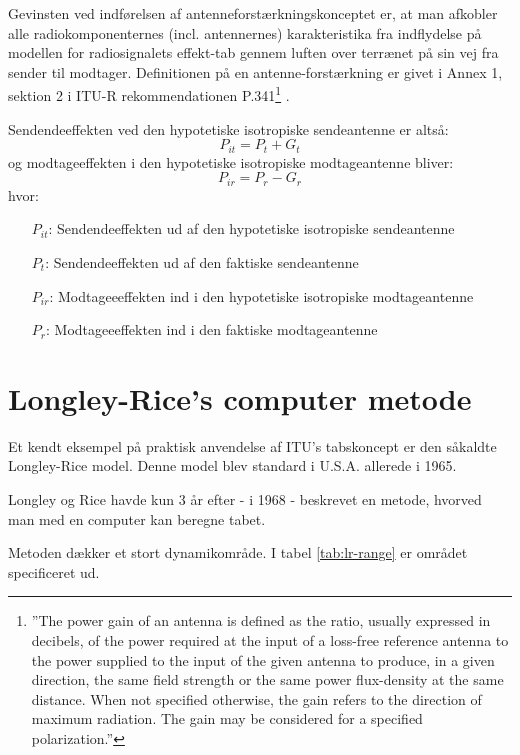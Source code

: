 Gevinsten ved indførelsen af antenneforstærkningskonceptet er, at man afkobler alle radiokomponenternes (incl. antennernes) karakteristika fra indflydelse på modellen for radiosignalets effekt-tab gennem luften over terrænet på sin vej fra sender til modtager. Definitionen på en antenne-forstærkning er givet i Annex 1, sektion 2 i ITU-R rekommendationen P.341\footnote{''The power gain of an antenna is defined as the ratio, usually expressed in decibels, of the power required at the input of a loss-free reference antenna to the power supplied to the input of the given antenna to produce, in a given direction, the same field strength or the same power flux-density at the same distance. When not specified otherwise, the gain refers to the direction of maximum radiation. The gain may be considered for a specified polarization.''} \cite{itur_p341-5}.

Sendendeeffekten ved den hypotetiske isotropiske sendeantenne er altså:
\begin{equation}
P_{it} = P_{t}+ G_t
\end{equation}
og modtageeffekten i den hypotetiske isotropiske modtageantenne bliver:
\begin{equation}
P_{ir} = P_{r}- G_r
\end{equation}
hvor:
\begin{itemize}[]
 \item [$P_{it}$:] Sendendeeffekten ud af den hypotetiske isotropiske sendeantenne 
 \item [$P_{t}$:] Sendendeeffekten ud af den faktiske sendeantenne
 \item [$P_{ir}$:] Modtageeeffekten ind i den hypotetiske isotropiske modtageantenne
 \item [$P_{r}$:] Modtageeeffekten ind i den faktiske modtageantenne
\end{itemize}
\FloatBarrier

\section{Longley-Rice's computer metode}
Et kendt eksempel på praktisk anvendelse af ITU's tabskoncept er den såkaldte Longley-Rice model. Denne model blev standard i U.S.A. allerede i 1965\cite{nbs-tn101}.

Longley og Rice havde kun 3 år efter - i 1968 - beskrevet en metode, hvorved man med en computer kan beregne tabet\cite{ntis-ad676874}.

Metoden dækker et stort dynamikområde. I tabel \ref{tab:lr-range} er området specificeret ud.

